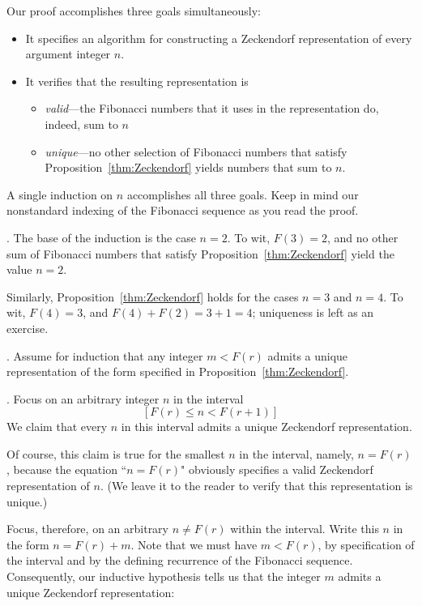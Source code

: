 Our proof accomplishes three goals simultaneously:
\begin{itemize}
\item
It specifies an algorithm for constructing a Zeckendorf representation of every argument integer $n$.
\item
It verifies that the resulting representation is
  \begin{itemize}
  \item
{\em valid}---the Fibonacci numbers that it uses in the representation do, indeed, sum to $n$
  \item
{\em unique}---no other selection of Fibonacci numbers that satisfy Proposition~\ref{thm:Zeckendorf} yields numbers that sum to $n$.
  \end{itemize}
\end{itemize}
A single induction on $n$ accomplishes all three goals.  Keep in mind our nonstandard indexing of the Fibonacci sequence as you read the proof.

\smallskip

.
The base of the induction is the case $n=2$.  To wit, $F(3) = 2$, and no other sum of Fibonacci numbers that satisfy Proposition~\ref{thm:Zeckendorf} yield the value $n=2$.

Similarly, Proposition~\ref{thm:Zeckendorf} holds for the cases $n=3$ and $n=4$.  To wit, $F(4) = 3$, and $F(4) + F(2) = 3 + 1 = 4$; uniqueness is left as an exercise.

\smallskip

.
Assume for induction that any integer $m < F(r)$ admits a unique representation of the form specified in Proposition~\ref{thm:Zeckendorf}.

\smallskip

.
Focus on an arbitrary integer $n$ in the interval
\[ [F(r) \leq n < F(r+1)] \]
We claim that every $n$ in this interval admits a unique Zeckendorf representation.

Of course, this claim is true for the smallest $n$ in the interval, namely, $n=F(r)$, because the equation ``$n=F(r)$" obviously specifies a valid Zeckendorf representation of $n$.  (We leave it to the reader to verify that this representation is unique.)

Focus, therefore, on an arbitrary $n \neq F(r)$ within the interval.  Write this $n$ in the form $n = F(r) + m$.  Note that we must have $m < F(r)$, by specification of the interval and by the defining recurrence of the Fibonacci sequence.  Consequently, our inductive hypothesis tells us that the integer $m$ admits a unique Zeckendorf representation:

